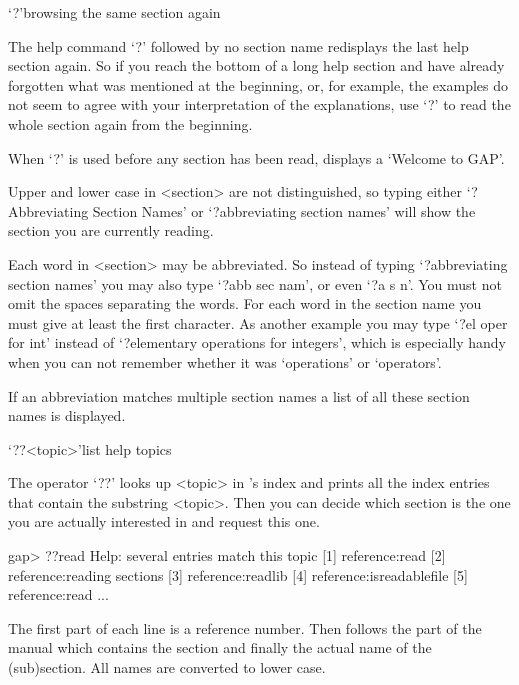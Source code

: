 

\>`?'{browsing the same section again}

The help command `?' followed by no section name redisplays the last help
section again. So if you reach the bottom of a long help section and have
already forgotten what was mentioned at the beginning, or, for example, the
examples do not seem to agree with your interpretation of the
explanations, use `?' to read the whole section again from the beginning.

When `?' is used before any section has been read, {\GAP} displays a
`Welcome to GAP'.


Upper and lower case in <section> are not distinguished, so typing either
`?Abbreviating Section Names' or `?abbreviating section names' will show
the section you are currently reading.

Each word in <section> may be abbreviated. So instead of typing
`?abbreviating section names' you may also type `?abb sec nam', or even `?a
s n'. You must not omit the spaces separating the words. For each word in
the section name you must give at least the first character. As another
example you may type `?el oper for int' instead of `?elementary operations
for integers', which is especially handy when you can not remember whether
it was `operations' or `operators'.

If an abbreviation matches multiple section names a list of all these
section names is displayed.


\>`??<topic>'{list help topics}

The operator `??' looks up <topic> in {\GAP}'s index and prints all the
index entries that contain the substring <topic>.
Then you can decide which section is the one you are actually interested
in and request this one.

\begintt
gap> ??read
Help: several entries match this topic
[1] reference:read
[2] reference:reading sections
[3] reference:readlib
[4] reference:isreadablefile
[5] reference:read
...
\endtt

The first part of each line is a reference number.  Then follows the
part of the manual which contains the section and finally the actual
name of the (sub)section. All names are converted to lower case.

